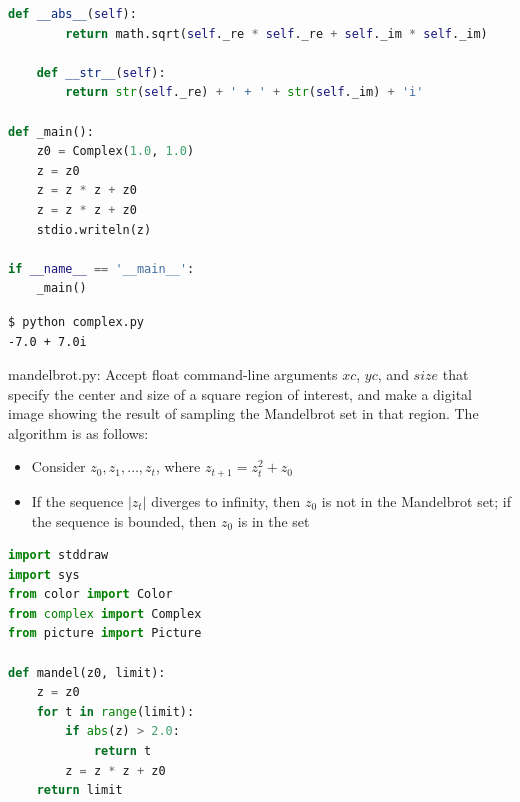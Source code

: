\documentclass[8pt,a4paper,compress]{beamer}
\begin{document}
\begin{frame}[fragile]
\pause

\begin{lstlisting}[language=Python]
    def __abs__(self):
        return math.sqrt(self._re * self._re + self._im * self._im)

    def __str__(self):
        return str(self._re) + ' + ' + str(self._im) + 'i'

def _main():
    z0 = Complex(1.0, 1.0)
    z = z0
    z = z * z + z0
    z = z * z + z0
    stdio.writeln(z)

if __name__ == '__main__':
    _main()
\end{lstlisting}

\pause

\begin{lstlisting}[language={}]
$ python complex.py 
-7.0 + 7.0i
\end{lstlisting}
\end{frame}

\begin{frame}[fragile]
\pause

\begin{framed}
\tiny mandelbrot.py: Accept float command-line arguments $xc$, $yc$, and $size$ that specify the center and size of a square region of interest, and make a digital image showing the result of sampling the Mandelbrot set in that region. The algorithm is as follows:
\begin{itemize}
\item Consider $z_0, z_1, \dots, z_t$, where $z_{t+1}=z_t^2+z_0$
\item If the sequence $|z_t|$ diverges to infinity, then $z_0$ is not in the Mandelbrot set; if the sequence is bounded, then $z_0$ is in the set
\end{itemize}
\end{framed}

\begin{lstlisting}[language=Python]
import stddraw
import sys
from color import Color
from complex import Complex
from picture import Picture

def mandel(z0, limit):
    z = z0
    for t in range(limit):
        if abs(z) > 2.0:
            return t
        z = z * z + z0
    return limit
\end{lstlisting}
\end{frame}
\end{document}
